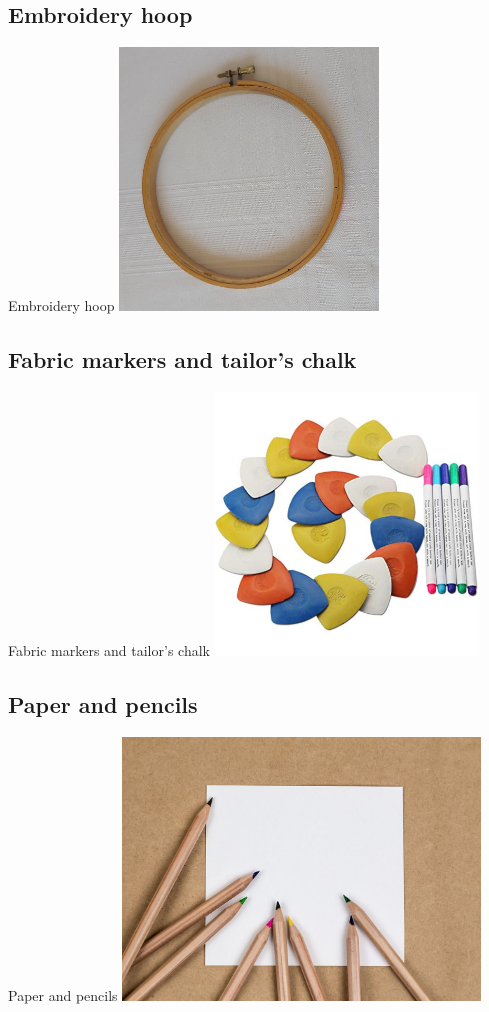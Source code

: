 \documentclass[aspectratio=169]{beamer}
\begin{document}
\subsection{Embroidery hoop}
\begin{frame}[fragile]{Embroidery hoop}
\includegraphics[height=2.75in]{Embroideryhoop.jpg}
\end{frame}
\subsection{Fabric markers and tailor's chalk}
\begin{frame}[fragile]{Fabric markers and tailor's chalk}
\includegraphics[height=2.75in]{Fabricmarkerstailorschalk.jpg}
\end{frame}
\subsection{Paper and pencils}
\begin{frame}[fragile]{Paper and pencils}
\includegraphics[height=2.75in]{Paperandpencils.jpg}
\end{frame}
\end{document}

